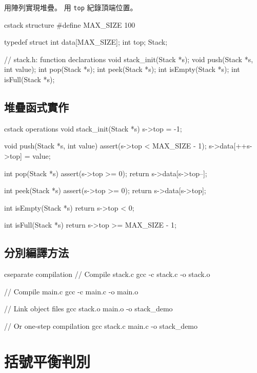 用陣列實現堆疊。 用 \texttt{top} 紀錄頂端位置。

\begin{code}{c}{stack structure}
#define MAX_SIZE 100

typedef struct {
    int data[MAX_SIZE];
    int top;
} Stack;

// stack.h: function declarations
void stack_init(Stack *s);
void push(Stack *s, int value);
int pop(Stack *s);
int peek(Stack *s);
int isEmpty(Stack *s);
int isFull(Stack *s);
\end{code}

\subsection*{堆疊函式實作}

\begin{code}{c}{stack operations}
void stack_init(Stack *s) {
    s->top = -1;
}

void push(Stack *s, int value) {
    assert(s->top < MAX_SIZE - 1);
    s->data[++s->top] = value;
}

int pop(Stack *s) {
    assert(s->top >= 0);
    return s->data[s->top--];
}

int peek(Stack *s) {
    assert(s->top >= 0);
    return s->data[s->top];
}

int isEmpty(Stack *s) {
    return s->top < 0;
}

int isFull(Stack *s) {
    return s->top >= MAX_SIZE - 1;
}
\end{code}

\subsection*{分別編譯方法}

\begin{code}{c}{separate compilation}
// Compile stack.c
gcc -c stack.c -o stack.o

// Compile main.c
gcc -c main.c -o main.o

// Link object files
gcc stack.o main.o -o stack_demo

// Or one-step compilation
gcc stack.c main.c -o stack_demo
\end{code}


\section{括號平衡判別}

